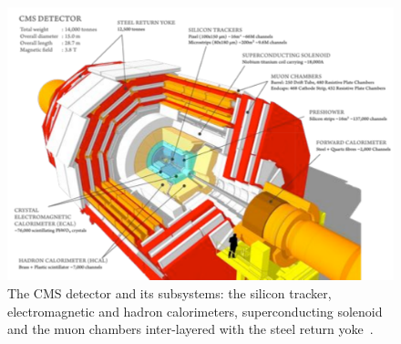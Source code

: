 \begin{figure}[h] 
    \centering
    \includegraphics[width=1.0\textwidth]{figures/cms/CMS.pdf}
    \caption{The CMS detector and its subsystems: the silicon tracker, electromagnetic and hadron calorimeters, superconducting solenoid and the muon chambers inter-layered with the steel return yoke~\cite{CMS}.}
    \label{fig:cms:CMS}
\end{figure}

